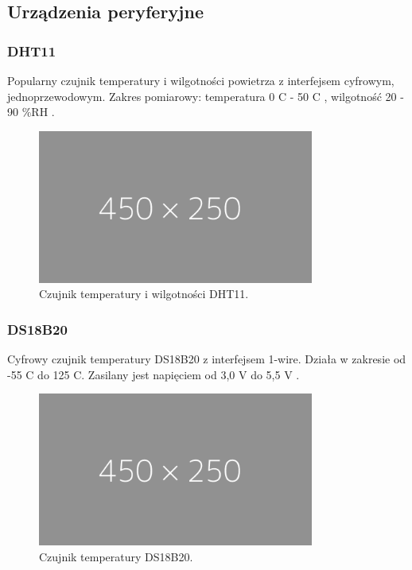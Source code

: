 \documentclass[12pt]{report}
\let\Oldsubsection\subsection
\renewcommand{\subsection}{\FloatBarrier\Oldsubsection}
\let\Oldsubsubsection\subsubsection
\renewcommand{\subsubsection}{\FloatBarrier\Oldsubsubsection}
\begin{document}
{\subsection{Urządzenia peryferyjne}
\subsubsection{DHT11}
Popularny czujnik temperatury i wilgotności powietrza z interfejsem cyfrowym, jednoprzewodowym. Zakres pomiarowy: temperatura 0 \textdegree{}C - 50 \textdegree{}C , wilgotność 20 - 90 \%RH \cite{DHT11}. %
\begin{figure}[h]
	\centering
	\includegraphics[width=0.81\textwidth]{images/placeholder-wide.png}
	\caption{Czujnik temperatury i wilgotności DHT11.}
\end{figure}
\subsubsection{DS18B20}
Cyfrowy czujnik temperatury DS18B20 z interfejsem 1-wire. Działa w zakresie od -55 \textdegree{}C do 125 \textdegree{}C. Zasilany jest napięciem od 3,0 V do 5,5 V \cite{DS18B20}. %
\begin{figure}[h]
	\centering
	\includegraphics[width=0.81\textwidth]{images/placeholder-wide.png}
	\caption{Czujnik temperatury DS18B20.}
\end{figure}
}
\end{document}
